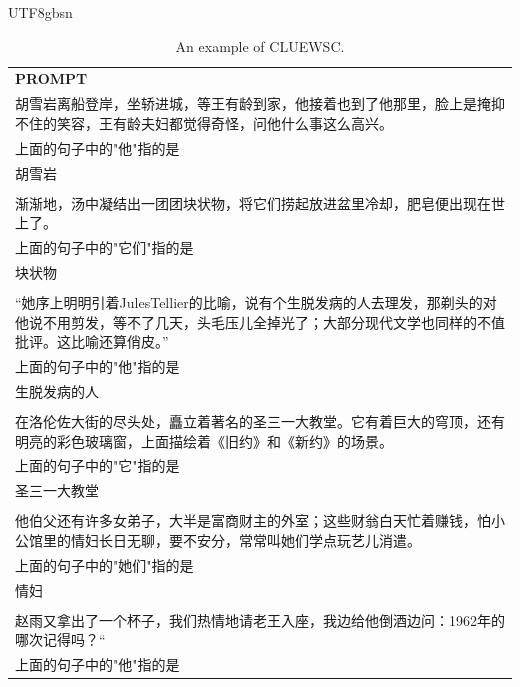 \documentclass[11pt, a4paper, logo, copyright, nonumbering]{deepseek}
\begin{document}
\begin{CJK*}{UTF8}{gbsn}
\begin{table}[ht]
    \centering \small
\begin{tabular}{p{12cm}}
\toprule
\textbf{PROMPT}\\
胡雪岩离船登岸，坐轿进城，等王有龄到家，他接着也到了他那里，脸上是掩抑不住的笑容，王有龄夫妇都觉得奇怪，问他什么事这么高兴。
\\上面的句子中的"他"指的是
\\胡雪岩
\\
\\渐渐地，汤中凝结出一团团块状物，将它们捞起放进盆里冷却，肥皂便出现在世上了。
\\上面的句子中的"它们"指的是
\\块状物
\\
\\“她序上明明引着JulesTellier的比喻，说有个生脱发病的人去理发，那剃头的对他说不用剪发，等不了几天，头毛压儿全掉光了；大部分现代文学也同样的不值批评。这比喻还算俏皮。”
\\上面的句子中的"他"指的是
\\生脱发病的人
\\
\\在洛伦佐大街的尽头处，矗立着著名的圣三一大教堂。它有着巨大的穹顶，还有明亮的彩色玻璃窗，上面描绘着《旧约》和《新约》的场景。
\\上面的句子中的"它"指的是
\\圣三一大教堂
\\
\\他伯父还有许多女弟子，大半是富商财主的外室；这些财翁白天忙着赚钱，怕小公馆里的情妇长日无聊，要不安分，常常叫她们学点玩艺儿消遣。
\\上面的句子中的"她们"指的是
\\情妇
\\
\\赵雨又拿出了一个杯子，我们热情地请老王入座，我边给他倒酒边问：1962年的哪次记得吗？“
\\上面的句子中的"他"指的是\\
\bottomrule
\end{tabular}
    \caption{\centering An example of CLUEWSC.}
    \label{tab:cluewsc_eval_format_example}
\end{table}


\end{CJK*}
\end{document}
